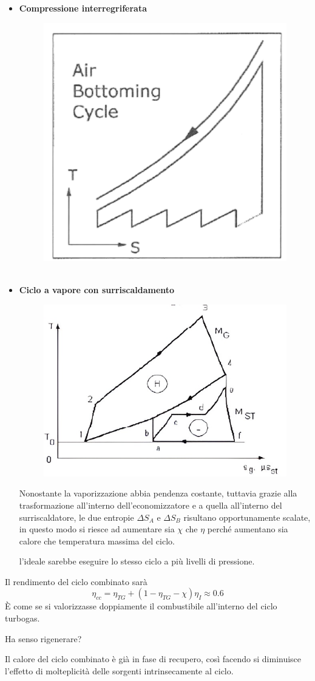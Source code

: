 \begin{adjustwidth}{2in}{}
\begin{itemize}
\begin{figure}[H]
			\label{fig:impianticombinati5}
		\end{figure}
		\item \textbf{Compressione interregriferata}
		\begin{figure}[H]
			\centering
			\includegraphics[width=0.3\linewidth]{immagini/impianticombinati6}\
			\label{fig:impianticombinati6}
		\end{figure}
		\newpage
		\item \textbf{Ciclo a vapore con surriscaldamento}
		\begin{figure}[H]
			\centering
			\includegraphics[width=0.5\linewidth]{immagini/impianticombinati7}
			\label{fig:impianticombinati7}
		\end{figure}
		Nonostante la vaporizzazione abbia pendenza costante, tuttavia grazie alla trasformazione all'interno dell'economizzatore e a quella all'interno del surriscaldatore, le due entropie $\Delta S_A$ e $\Delta S_B$ risultano opportunamente scalate, in questo modo si riesce ad aumentare sia $\chi$ che $\eta$ perché aumentano sia calore che temperatura massima del ciclo. 
		
		l'ideale sarebbe eseguire lo stesso ciclo a più livelli di pressione.
	\end{itemize}
	Il rendimento del ciclo combinato sarà 
	\[\eta_{cc} = \eta_{TG} + (1-\eta_{TG}-\chi)\eta_I\approx0.6\]
	È come se si valorizzasse doppiamente il combustibile all'interno del ciclo turbogas. \newline
	
	Ha senso rigenerare?
	
	Il calore del ciclo combinato è già in fase di recupero, così facendo si diminuisce l'effetto di molteplicità delle sorgenti intrinsecamente al ciclo.	
\end{adjustwidth}


